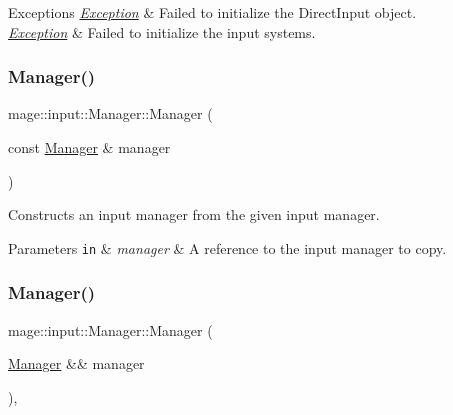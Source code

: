\begin{DoxyExceptions}{Exceptions}
{\em \mbox{\hyperlink{classmage_1_1_exception}{Exception}}} & Failed to initialize the Direct\+Input object. \\
\hline
{\em \mbox{\hyperlink{classmage_1_1_exception}{Exception}}} & Failed to initialize the input systems. \\
\hline
\end{DoxyExceptions}
\mbox{\label{classmage_1_1input_1_1_manager_a345b3b9384e5a3f31ff183e5208fa56b}} 
\subsubsection{\texorpdfstring{Manager()}{Manager()}\hspace{0.1cm}{\footnotesize\ttfamily [2/3]}}
{\footnotesize\ttfamily mage\+::input\+::\+Manager\+::\+Manager (\begin{DoxyParamCaption}\item[{const \mbox{\hyperlink{classmage_1_1input_1_1_manager}{Manager}} \&}]{manager }\end{DoxyParamCaption})\hspace{0.3cm}{\ttfamily [delete]}}

Constructs an input manager from the given input manager.


\begin{DoxyParams}[1]{Parameters}
\mbox{\tt in}  & {\em manager} & A reference to the input manager to copy. \\
\hline
\end{DoxyParams}
\mbox{\label{classmage_1_1input_1_1_manager_ab4aae9f96e63bdb8d4ab0de08932b2eb}} 
\subsubsection{\texorpdfstring{Manager()}{Manager()}\hspace{0.1cm}{\footnotesize\ttfamily [3/3]}}
{\footnotesize\ttfamily mage\+::input\+::\+Manager\+::\+Manager (\begin{DoxyParamCaption}\item[{\mbox{\hyperlink{classmage_1_1input_1_1_manager}{Manager}} \&\&}]{manager }\end{DoxyParamCaption})\hspace{0.3cm}{\ttfamily [default]}, {\ttfamily [noexcept]}}

